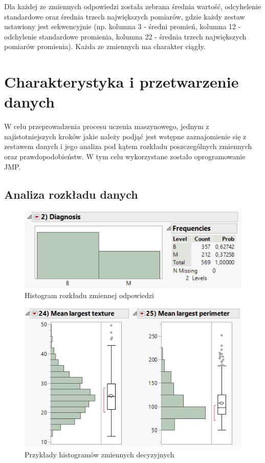 	Dla każdej ze zmiennych odpowiedzi została zebrana średnia wartość, odcyhelenie standardowe oraz średnia trzech największych pomiarów, gdzie każdy zestaw ustawiony jest sekwencyjnie (np. kolumna 3 - średni promień, kolumna 12 - odchylenie standardowe promienia, kolumna 22 - średnia trzech największych pomiarów promienia). Każda ze zmiennych ma charakter ciągły.
	
\section{Charakterystyka i przetwarzenie danych}

	W celu przeprowadzenia procesu uczenia maszynowego, jednym z najistotniejszych kroków jakie należy podjąć jest wstępne zaznajomienie się z zestawem danych i jego analiza pod kątem rozkładu poszczególnych zmiennych oraz prawdopodobieństw. W tym celu wykorzystane zostało oprogramowanie JMP. 

	\subsection{Analiza rozkładu danych}
	
	\begin{figure}[!ht]
		\centering
		\includegraphics[width=0.8\linewidth]{Rysunki/Rozdzial2/diagnosis_distribution}
		\caption{Histogram rozkładu zmiennej odpowiedzi}
		\label{fig:diagnosisdistribution}
	\end{figure}
	
	\begin{figure}[!ht]
		\centering
		\includegraphics[width=0.7\linewidth]{Rysunki/Rozdzial2/variable_distribution}
		\caption{Przykłady histogramów zmiennych decyzyjnych}
		\label{fig:variabledistribution}
	\end{figure}
	
